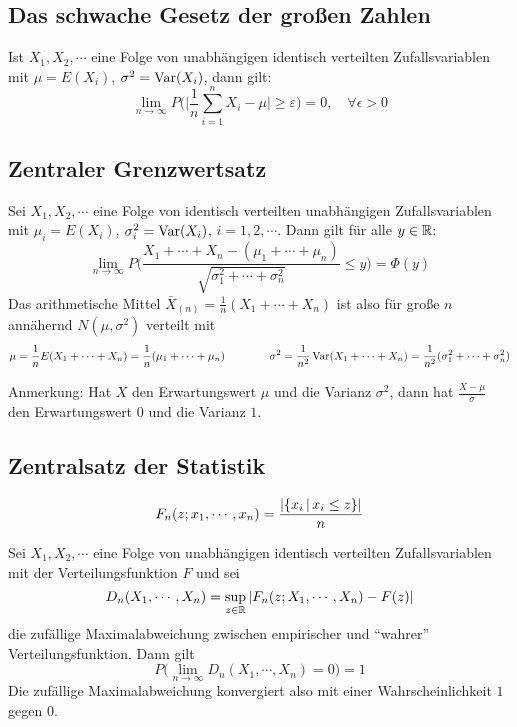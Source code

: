 		\subsection{Das schwache Gesetz der großen Zahlen}
			Ist \( X_1, X_2, \cdots \) eine Folge von unabhängigen identisch verteilten Zufallsvariablen mit \( \mu = E(X_i) \), \( \sigma^2 = \operatorname{Var}(X_i) \), dann gilt:
			\begin{equation*}
				\lim\limits_{n \rightarrow \infty} P\Bigg( \bigg\lvert\frac{1}{n} \sum_{i = 1}^{n} X_i - \mu\bigg\rvert \geq \varepsilon \Bigg) = 0, \quad \forall \epsilon > 0
			\end{equation*}

		\subsection{Zentraler Grenzwertsatz}
			Sei \( X_1, X_2, \cdots \) eine Folge von identisch verteilten unabhängigen Zufallsvariablen mit \( \mu_i = E(X_i) \), \( \sigma_i^2 = \operatorname{Var}(X_i) \), \( i = 1, 2, \cdots \). Dann gilt für alle \( y \in \mathbb{R} \):
			\begin{equation*}
				\lim\limits_{n \rightarrow \infty} P\Bigg( \frac{X_1 + \cdots + X_n - (\mu_1 + \cdots + \mu_n)}{\sqrt{\sigma_1^2 + \cdots + \sigma_n^2}} \leq y \Bigg) = \Phi(y)
			\end{equation*}
			Das arithmetische Mittel \( \bar{X}_{(n)} = \frac{1}{n} (X_1 + \cdots + X_n) \) ist also für große \(n\) annähernd \( N(\mu, \sigma^2) \) verteilt mit
			\begin{equation*}
				\mu = \frac{1}{n} E(X_1 + \cdots + X_n) = \frac{1}{n} (\mu_1 + \cdots + \mu_n) \qquad\qquad \sigma^2 = \frac{1}{n^2} \operatorname{Var}(X_1 + \cdots + X_n) = \frac{1}{n^2} (\sigma_1^2 + \cdots + \sigma_n^2)
			\end{equation*}

			Anmerkung: Hat \(X\) den Erwartungswert \(\mu\) und die Varianz \(\sigma^2\), dann hat \( \frac{X - \mu}{\sigma} \) den Erwartungswert \(0\) und die Varianz \(1\).

		\subsection{Zentralsatz der Statistik}
			\begin{equation*}
				F_n(z; x_1, \cdots, x_n) = \frac{\abs{\{ x_i \,\vert\, x_i \leq z \}}}{n}
			\end{equation*}

			Sei \( X_1, X_2, \cdots \) eine Folge von unabhängigen identisch verteilten Zufallsvariablen mit der Verteilungsfunktion \(F\) und sei
			\begin{equation*}
				D_n(X_1, \cdots, X_n) = \sup_{z \in \mathbb{R}} \abs{F_n(z; X_1, \cdots, X_n) - F(z)}
			\end{equation*}
			die zufällige Maximalabweichung zwischen empirischer und \enquote{wahrer} Verteilungsfunktion. Dann gilt
			\begin{equation*}
				P\bigg( \lim\limits_{n \rightarrow \infty} D_n(X_1, \cdots, X_n) = 0 \bigg) = 1
			\end{equation*}
			Die zufällige Maximalabweichung konvergiert also mit einer Wahrscheinlichkeit \(1\) gegen \(0\).

